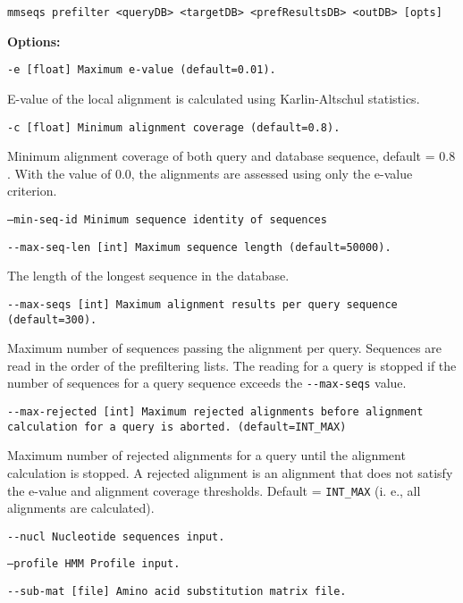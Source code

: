 \documentclass[11pt,a4paper]{report}
\begin{document}
\texttt{mmseqs prefilter <queryDB> <targetDB> <prefResultsDB> <outDB>
{[}opts{]}}

\textbf{Options:}

\texttt{\small -e {[}float{]} Maximum e-value (default=0.01).}{\small \par}

E-value of the local alignment is calculated using Karlin-Altschul
statistics.

\texttt{\small -c {[}float{]} Minimum alignment coverage (default=0.8).}{\small \par}

Minimum alignment coverage of both query and database sequence, default
= $0.8$. With the value of $0.0$, the alignments are assessed using
only the e-value criterion.

\texttt{\small --min-seq-id Minimum sequence identity of sequences}{\small \par}


\texttt{\small -{}-max-seq-len {[}int{]} Maximum sequence length (default=50000).}{\small \par}

The length of the longest sequence in the database.

\texttt{\small -{}-max-seqs {[}int{]} Maximum alignment results per
query sequence (default=300).}{\small \par}

Maximum number of sequences passing the alignment per query. Sequences
are read in the order of the prefiltering lists. The reading for a
query is stopped if the number of sequences for a query sequence exceeds
the \texttt{-{}-max-seqs} value.

\texttt{\small -{}-max-rejected {[}int{]} Maximum rejected alignments
before alignment calculation for a query is aborted. (default=INT\_MAX)}{\small \par}

Maximum number of rejected alignments for a query until the alignment
calculation is stopped. A rejected alignment is an alignment that
does not satisfy the e-value and alignment coverage thresholds. Default
= \texttt{INT\_MAX} (i. e., all alignments are calculated).

\texttt{\small -{}-nucl Nucleotide sequences input.}{\small \par}

\texttt{\small --profile HMM Profile input.}{\small \par}


\texttt{\small -{}-sub-mat {[}file{]} Amino acid substitution matrix
file.}{\small \par}
\end{document}
